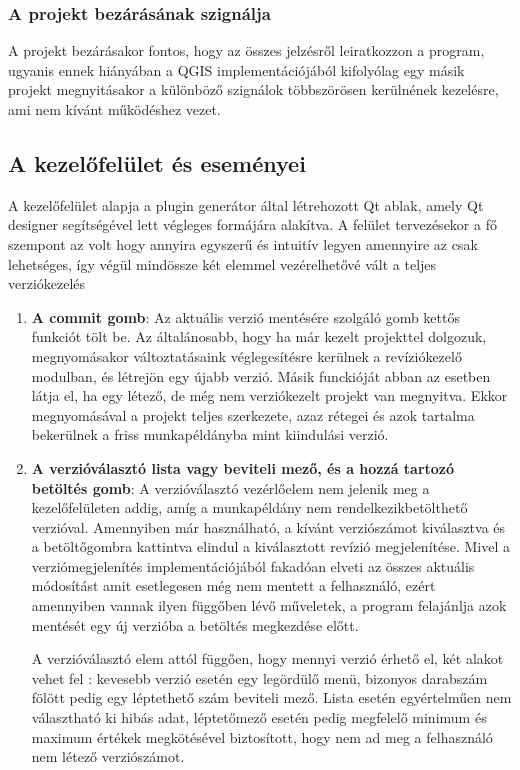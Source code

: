 \begin{list}{}{}
\subsubsection{A projekt bezárásának szignálja}
A projekt bezárásakor fontos, hogy az összes jelzésről leiratkozzon a program, ugyanis ennek hiányában a QGIS implementációjából kifolyólag egy másik projekt megnyitásakor a különböző szignálok többszörösen kerülnének kezelésre, ami nem kívánt működéshez vezet.
\end{list}
\subsection{A kezelőfelület és eseményei}
A kezelőfelület alapja a plugin generátor által létrehozott Qt ablak, amely Qt designer segítségével lett végleges formájára alakítva. A felület tervezésekor a fő szempont az volt hogy annyira egyszerű és intuitív legyen amennyire az csak lehetséges, így végül mindössze két elemmel vezérelhetővé vált a teljes verziókezelés
\begin{enumerate}
	\item \textbf{A commit gomb}: Az aktuális verzió mentésére szolgáló gomb kettős funkciót tölt be. Az általánosabb, hogy ha már kezelt projekttel dolgozuk, megnyomásakor változtatásaink véglegesítésre kerülnek a revíziókezelő modulban, és létrejön egy újabb verzió. Másik funckióját abban az esetben látja el, ha egy létező, de még nem verziókezelt projekt van megnyitva. Ekkor megnyomásával a projekt teljes szerkezete, azaz rétegei és azok tartalma bekerülnek a friss munkapéldányba mint kiindulási verzió.
	\item \textbf{A verzióválasztó lista vagy beviteli mező, és a hozzá tartozó betöltés gomb}: A verzióválasztó vezérlőelem nem jelenik meg a kezelőfelületen addig, amíg a munkapéldány nem rendelkezikbetölthető verzióval. Amennyiben már használható, a kívánt verziószámot kiválasztva és a betöltőgombra kattintva elindul a kiválasztott revízió megjelenítése. Mivel a verziómegjelenítés implementációjából fakadóan elveti az összes aktuális módosítást amit esetlegesen még nem mentett a felhasználó, ezért amennyiben vannak ilyen függőben lévő műveletek, a program felajánlja azok mentését egy új verzióba a betöltés megkezdése előtt.
	\begin{note}
	A verzióválasztó elem attól függően, hogy mennyi verzió érhető el, két alakot vehet fel : kevesebb verzió esetén egy legördülő menü, bizonyos darabszám fölött pedig egy léptethető szám beviteli mező. Lista esetén egyértelműen nem választható ki hibás adat, léptetőmező esetén pedig megfelelő minimum és maximum értékek megkötésével biztosított, hogy nem ad meg a felhasználó nem létező verziószámot.
	\end{note}
\end{enumerate}

